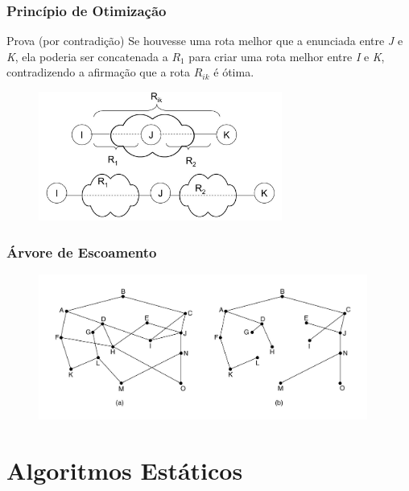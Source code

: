 \documentclass{beamer}
\begin{document}
\begin{frame}
\frametitle{Princípio de Otimização}
\begin{block}{Prova (por contradição)}
Se houvesse uma rota melhor que a enunciada entre \emph{J} e \emph{K}, ela poderia ser
concatenada a $R_1$ para criar uma rota melhor entre \emph{I} e \emph{K}, contradizendo a
afirmação que a rota $R_{ik}$ é ótima.
\end{block}
\begin{figure}[htp]
\begin{center}
  \includegraphics[width=80mm]{Imagens/PrincipioOtimizacao.jpeg}
  \label{principio_otimizacao2}
\end{center}
\end{figure}
\end{frame}

\begin{frame}
\frametitle{Árvore de Escoamento}
\begin{figure}[htp]
\begin{center}
  \includegraphics[width=108mm]{Imagens/ArvoreEscoamento.jpeg}
  \label{arvore_escoamento}
\end{center}
\end{figure}
\end{frame}


\section{Algoritmos Estáticos}
\subsection{}
\end{document}

